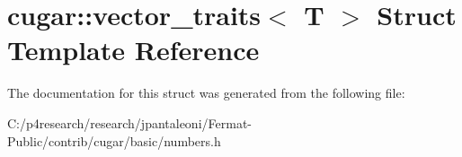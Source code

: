 \hypertarget{structcugar_1_1vector__traits}{}\section{cugar\+:\+:vector\+\_\+traits$<$ T $>$ Struct Template Reference}
\label{structcugar_1_1vector__traits}


The documentation for this struct was generated from the following file\+:\begin{DoxyCompactItemize}
\item 
C\+:/p4research/research/jpantaleoni/\+Fermat-\/\+Public/contrib/cugar/basic/numbers.\+h\end{DoxyCompactItemize}
